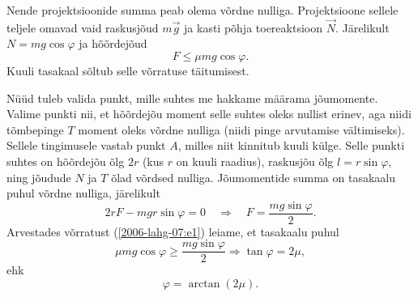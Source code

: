 Nende projektsioonide summa peab olema võrdne nulliga. Projektsioone sellele teljele omavad vaid raskusjõud $m\vec g$ ja kasti põhja toereaktsioon $\vec N$. Järelikult
$N = mg \cos \varphi$ ja hõõrdejõud
\begin{equation} \label{2006-lahg-07:e1}
F \leq \mu mg \cos\varphi.
\end{equation}
Kuuli tasakaal sõltub selle võrratuse täitumisest.

Nüüd tuleb valida punkt, mille suhtes me hakkame määrama jõumomente. Valime punkti nii, et hõõrdejõu moment selle suhtes oleks nullist erinev, aga niidi tõmbepinge $T$ moment oleks võrdne nulliga (niidi pinge arvutamise vältimiseks). Sellele tingimusele vastab punkt $A$, milles niit kinnitub kuuli külge. Selle punkti suhtes on hõõrdejõu õlg $2r$ (kus $r$ on kuuli raadius), raskusjõu õlg $l = r \sin \varphi$, ning jõudude $N$ ja $T$ õlad võrdsed nulliga. Jõumomentide summa on tasakaalu puhul võrdne nulliga, järelikult
\[
2 r F-m g r \sin \varphi=0 \quad \Rightarrow \quad F=\frac{m g \sin \varphi}{2}.
\]
Arvestades võrratust (\ref{2006-lahg-07:e1}) leiame, et tasakaalu puhul
\[
\mu m g \cos \varphi \geq \frac{m g \sin \varphi}{2} \Rightarrow \tan \varphi=2 \mu,
\]
ehk
\[
\varphi = \arctan (2\mu).
\]
\probend